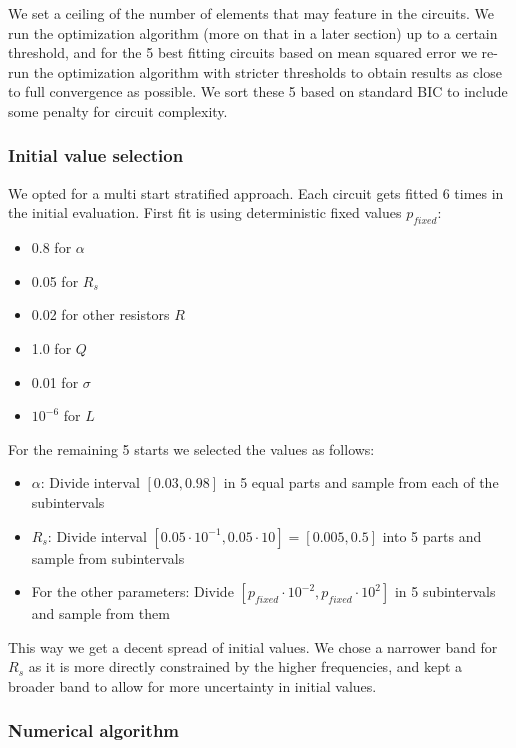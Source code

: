 \documentclass[
    11pt,
    a4paper,
    oneside
]{article}
\begin{document}
We set a ceiling of the number of elements that may feature in the circuits. We run the optimization algorithm (more on that in a later section)
up to a certain threshold, and for the 5 best fitting circuits based on mean squared error we re-run the optimization algorithm with 
stricter thresholds to obtain results as close to full convergence as possible. We sort these 5 based on standard BIC to include some 
penalty for circuit complexity.

\subsubsection{Initial value selection}

We opted for a multi start stratified approach. Each circuit gets fitted 6 times in the initial evaluation. First fit is using deterministic
fixed values $p_{fixed}$:

\begin{itemize}
    \item 0.8 for $\alpha$
    \item 0.05 for $R_s$
    \item 0.02 for other resistors $R$
    \item 1.0 for $Q$
    \item 0.01 for $\sigma$
    \item $10^{-6}$ for $L$
\end{itemize}

For the remaining 5 starts we selected the values as follows:
\begin{itemize}
    \item $\alpha$: Divide interval $[0.03,0.98]$ in 5 equal parts and sample from each of the subintervals
    \item $R_s$: Divide interval $[0.05\cdot10^{-1},0.05\cdot10]=[0.005,0.5]$ into 5 parts and sample from subintervals
    \item For the other parameters: Divide $[p_{fixed}\cdot10^{-2},p_{fixed}\cdot10^{2}]$ in 5 subintervals and sample from them
\end{itemize}

This way we get a decent spread of initial values. We chose a narrower band for $R_s$ as it is more directly constrained by the higher frequencies,
and kept a broader band to allow for more uncertainty in initial values.

\subsubsection{Numerical algorithm}\label{numalg}
\end{document}
